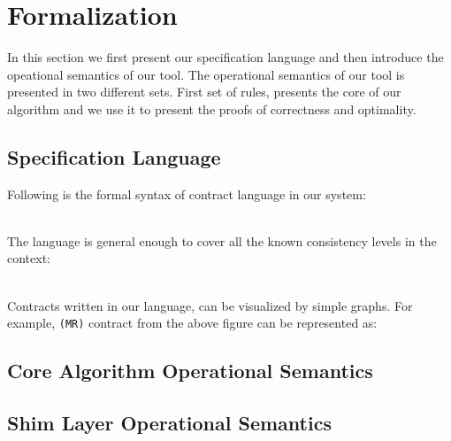 \section{Formalization}
In this section we first present our specification language and then
introduce the opeational semantics of our tool. The operational semantics of our tool is presented in two different sets. First set of rules, presents the core of our algorithm and we use it to present the proofs of correctness and optimality. 

\subsection{Specification Language}
Following is the formal syntax of contract language in our system:

\\ The language is general enough to cover all  the known consistency
levels in the context:

\\ Contracts written in our language, can be visualized by simple graphs. For example, \texttt{(MR)} contract from the above figure can be represented as:



\subsection{Core Algorithm Operational Semantics}



\subsection {Shim Layer Operational Semantics}




